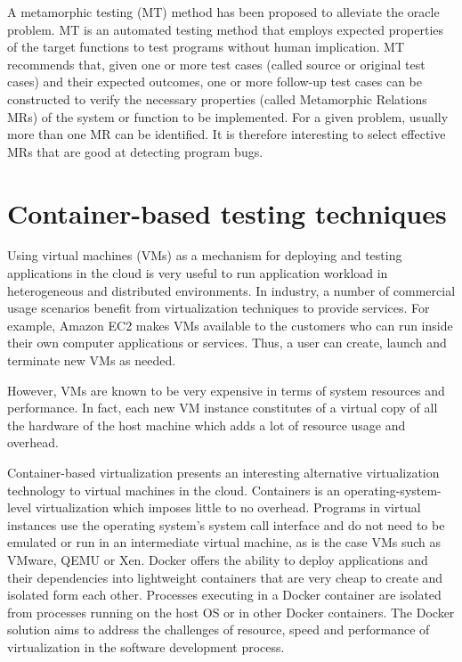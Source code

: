 A metamorphic testing (MT) method has been proposed to alleviate the oracle problem\cite{chen2004case}. MT is an automated testing method that employs expected properties of the target functions to test programs without human implication. 
MT recommends that, given one or more test cases (called source or original test cases) and their expected outcomes, one or more follow-up test cases can be constructed to verify the necessary properties (called Metamorphic Relations MRs) of the system or function to be implemented.
For a given problem, usually more than one MR can be identified. It is therefore interesting to select effective MRs that are good at detecting program bugs.


\section{Container-based testing techniques}

Using virtual machines (VMs) as a mechanism for deploying and testing applications in the cloud is very useful to run application workload in heterogeneous and distributed environments.
In industry, a number of commercial usage scenarios benefit from virtualization techniques to provide services. For example, Amazon EC2 makes VMs available to the customers who can run inside their own computer applications or services. Thus, a user can create, launch and terminate new VMs as needed.  

However, VMs are known to be very expensive in terms of system resources and performance. In fact, each new VM instance constitutes of a virtual copy of all the hardware of the host machine which adds a lot of resource usage and overhead\cite{merkel2014docker}. 

Container-based virtualization presents an interesting alternative virtualization technology to virtual machines in the cloud. Containers is an operating-system-level virtualization which imposes little to no overhead. Programs in virtual instances use the operating system's system call interface and do not need to be emulated or run in an intermediate virtual machine, as is the case VMs such as VMware, QEMU or Xen.
Docker offers the ability to deploy applications and their dependencies into lightweight containers that are very cheap to create and isolated form each other. Processes executing in a Docker container are isolated from processes running on the host OS or in other Docker containers. The Docker solution aims to address the challenges of resource, speed and performance of virtualization in the software development process. 

